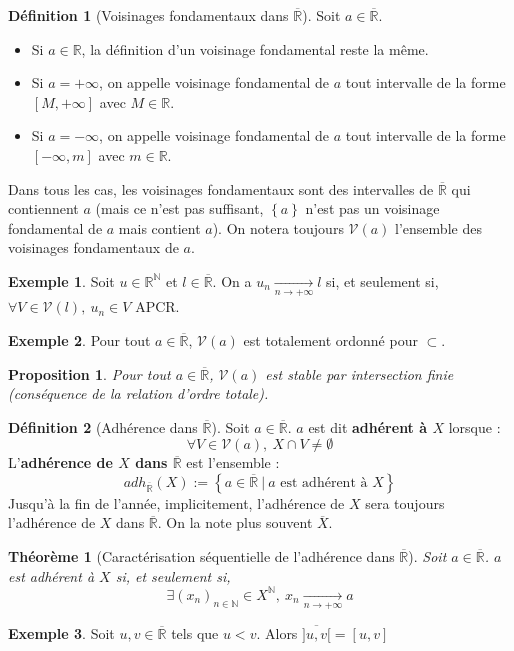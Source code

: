 \documentclass[french]{book}
\newcommand{\N}{\mathbb{N}}
\newcommand{\R}{\mathbb{R}}
\theoremstyle{plain}
\newtheorem{thm}{Théorème}[chapter]
\newtheorem{prop}{Proposition}[chapter]
\theoremstyle{definition}
\newtheorem{dfn}{Définition}[chapter]
\newtheorem{exa}{Exemple}[chapter]
\theoremstyle{remark}
\begin{document}
\begin{dfn}[Voisinages fondamentaux dans $\overline{\R}$]
	Soit $a\in\overline{\R}$.\begin{itemize}
		\item Si $a\in\R$, la définition d'un voisinage fondamental reste la même.
		\item Si $a=+\infty$, on appelle voisinage fondamental de $a$ tout intervalle de la forme $[M,+\infty]$ avec $M\in\R$.
		\item Si $a=-\infty$, on appelle voisinage fondamental de $a$ tout intervalle de la forme $[-\infty,m]$ avec $m\in\R$.
	\end{itemize}
	Dans tous les cas, les voisinages fondamentaux sont des intervalles de $\overline{\R}$ qui contiennent $a$ (mais ce n'est pas suffisant, $\left\{a\right\}$ n'est pas un voisinage fondamental de $a$ mais contient $a$). On notera toujours $\mathcal{V}(a)$ l'ensemble des voisinages fondamentaux de $a$.
\end{dfn}
\begin{exa}
	Soit $u\in\R^\N$ et $l\in\overline{\R}$. On a $u_n\xrightarrow[n\to+\infty]{}l$ si, et seulement si, $\forall V\in\mathcal{V}(l),\ u_n\in V$ APCR.
\end{exa}
\begin{exa}
	Pour tout $a\in\overline{\R}$, $\mathcal{V}(a)$ est totalement ordonné pour $\subset$.
\end{exa}
\begin{prop}
	Pour tout $a\in\overline{\R}$, $\mathcal{V}(a)$ est stable par intersection finie (conséquence de la relation d'ordre totale).
\end{prop}
\begin{dfn}[Adhérence dans $\overline{\R}$]
	Soit $a\in\overline{\R}$. $a$ est dit \textbf{adhérent à $X$} lorsque : $$\forall V\in\mathcal{V}(a),\ X\cap V\ne\emptyset$$ L'\textbf{adhérence de $X$ dans $\overline{\R}$} est l'ensemble : $$adh_{\overline{\R}}(X):=\left\{a\in\overline{\R}\ | \ a\text{ est adhérent à }X\right\}$$ Jusqu'à la fin de l'année, implicitement, l'adhérence de $X$ sera toujours l'adhérence de $X$ dans $\overline{\R}$. On la note plus souvent $\overline{X}$.
\end{dfn}
\begin{thm}[Caractérisation séquentielle de l'adhérence dans $\overline{\R}$]
	Soit $a\in\overline{\R}$. $a$ est adhérent à $X$ si, et seulement si, $$\exists(x_n)_{n\in\N}\in X^\N,\ x_n\xrightarrow[n\to+\infty]{}a$$
\end{thm}
\begin{exa}
	Soit $u,v\in\overline{\R}$ tels que $u<v$. Alors $\overline{]u,v[}=[u,v]$
\end{exa}
\end{document}
